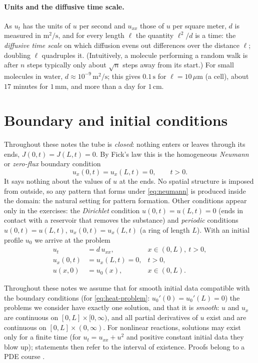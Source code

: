 \paragraph{Units and the diffusive time scale.}
As $u_t$ has the units of $u$ per second and $u_{xx}$ those of $u$ per square meter,
$d$ is measured in $\mathrm{m}^2/\mathrm{s}$, and for every length $\ell$ the
quantity $\ell^2/d$ is a time: the \emph{diffusive time scale} on which diffusion
evens out differences over the distance $\ell$; doubling $\ell$ quadruples it.
(Intuitively, a molecule performing a random walk is after $n$ steps typically
only about $\sqrt n$ steps away from its start.) For small molecules in water,
$d\approx10^{-9}\,\mathrm{m}^2/\mathrm{s}$; this gives $0.1\,\mathrm{s}$ for
$\ell=10\,\mu\mathrm{m}$ (a cell), about $17$ minutes for $1\,\mathrm{mm}$, and more
than a day for $1\,\mathrm{cm}$.

\section{Boundary and initial conditions}\label{sec:diffusion-bc}

Throughout these notes the tube is \emph{closed}: nothing enters or leaves through
its ends, $J(0,t)=J(L,t)=0$. By Fick's law this is the homogeneous \emph{Neumann} or
\emph{zero-flux} boundary condition
\begin{equation}\label{eq:neumann}
  u_x(0,t)=u_x(L,t)=0,\qquad t>0 .
\end{equation}
It says nothing about the values of $u$ at the ends. No spatial structure is imposed
from outside, so any pattern that forms under \eqref{eq:neumann} is produced inside
the domain: the natural setting for pattern formation. Other conditions appear only
in the exercises: the \emph{Dirichlet} condition $u(0,t)=u(L,t)=0$ (ends in contact
with a reservoir that removes the substance) and \emph{periodic} conditions
$u(0,t)=u(L,t)$, $u_x(0,t)=u_x(L,t)$ (a ring of length $L$). With an initial profile $u_0$ we arrive at the problem
\begin{equation}\label{eq:heat-problem}
\begin{aligned}
  u_t &= d\,u_{xx}, & x\in(0,L),\ t>0,\\
  u_x(0,t) &= u_x(L,t) = 0, & t>0,\\
  u(x,0) &= u_0(x), & x\in(0,L).
\end{aligned}
\end{equation}

\begin{remark}\label{rem:well-posedness}
Throughout these notes we assume that for smooth initial data compatible with the
boundary conditions (for \eqref{eq:heat-problem}: $u_0'(0)=u_0'(L)=0$) the problems
we consider have exactly one solution, and that it is \emph{smooth}: $u$ and $u_x$
are continuous on $[0,L]\times[0,\infty)$, and all partial derivatives of $u$ exist
and are continuous on $[0,L]\times(0,\infty)$.
For nonlinear reactions, solutions may exist only for a finite time (for
$u_t=u_{xx}+u^2$ and positive constant initial data they blow up); statements then
refer to the interval of existence. Proofs belong to a PDE course
\cite{Evans2010,Strauss2008}.
\end{remark}

